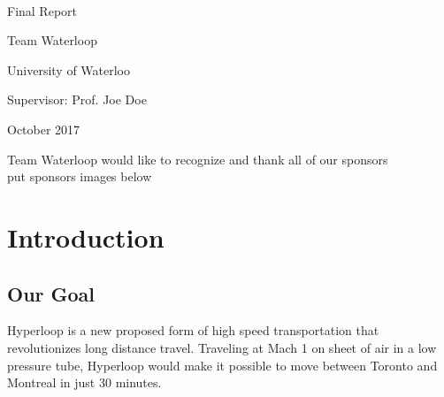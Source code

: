 \documentclass[11pt,a4paper,oldfontcommands]{memoir}
\begin{document}
   \thispagestyle{empty}

   {%
   \sffamily
   \centering
   \Large

   ~\vspace{\fill}

   {\huge
   Final Report
   }

   \vspace{2.5cm}

   {\LARGE
   Team Waterloop
   }

   \vspace{3.5cm}

   University of Waterloo

   \vspace{3.5cm}

   Supervisor: Prof. Joe Doe

   \vspace{\fill}

   October 2017

   }%

   \cleardoublepage
   \begin{center}
   Team Waterloop would like to recognize and thank all of our sponsors\\
   put sponsors images below
   \end{center}
   \clearpage

   \tableofcontents*

   \clearpage


   \chapter{Introduction}

   \section{Our Goal}
   Hyperloop is a new proposed form of high speed transportation that revolutionizes long distance travel. Traveling at Mach 1 on sheet of air in a low pressure tube, Hyperloop would make it possible to move between Toronto and Montreal in just 30 minutes.
\end{document}
